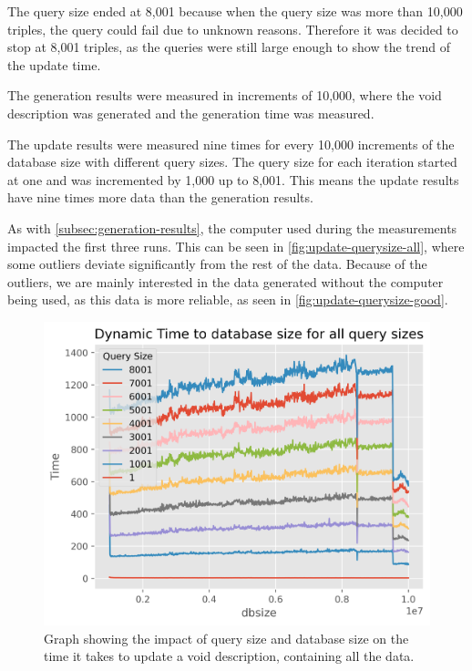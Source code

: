 The query size ended at 8,001 because when the query size was more than 10,000 triples, the query could fail due to unknown reasons. Therefore it was decided to stop at 8,001 triples, as the queries were still large enough to show the trend of the update time.

The generation results were measured in increments of 10,000, where the \gls{void} description was generated and the generation time was measured.

The update results were measured nine times for every 10,000 increments of the database size with different query sizes. The query size for each iteration started at one and was incremented by 1,000 up to 8,001. This means the update results have nine times more data than the generation results.

As with \autoref{subsec:generation-results}, the computer used during the measurements impacted the first three runs. This can be seen in \autoref{fig:update-querysize-all}, where some outliers deviate significantly from the rest of the data. Because of the outliers, we are mainly interested in the data generated without the computer being used, as this data is more reliable, as seen in \autoref{fig:update-querysize-good}.

\begin{figure}[htb!]
    \centering
    \includegraphics[width=0.8\columnwidth]{figures/dynamic-time-query-size-all.png}
    \caption{Graph showing the impact of query size and database size on the time it takes to update a \gls{void} description, containing all the data.}
    \label{fig:update-querysize-all}
\end{figure}


